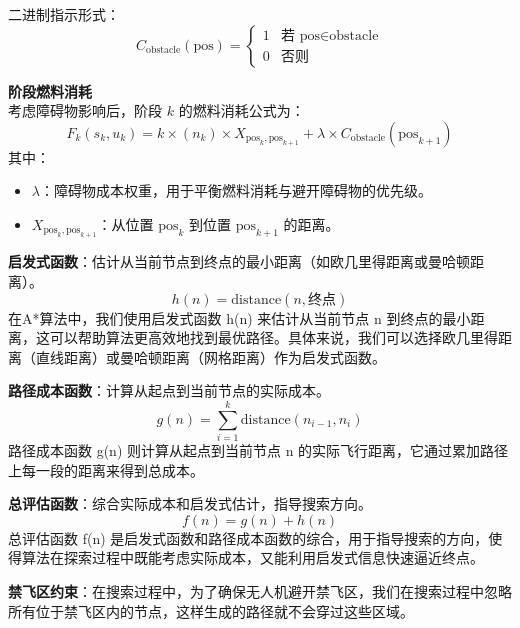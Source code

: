 \documentclass[a4paper]{article} %
\begin{document}
{二进制指示形式：
\begin{equation}
C_{\text{obstacle}}(\text{pos}) = 
\begin{cases} 
1 & \text{若 } \text{pos} \in \text{obstacle} \\
0 & \text{否则}
\end{cases}
\end{equation}

 \textbf{阶段燃料消耗} \\
考虑障碍物影响后，阶段 \( k \) 的燃料消耗公式为：
\begin{equation}
F_{k}(s_{k}, u_{k}) = k \times (n_{k}) \times X_{\text{pos}_{k}, \text{pos}_{k+1}} + \lambda \times C_{\text{obstacle}}(\text{pos}_{k+1})
\end{equation}
其中：
\begin{itemize}
    \item \( \lambda \)：障碍物成本权重，用于平衡燃料消耗与避开障碍物的优先级。
    \item \( X_{\text{pos}_{k}, \text{pos}_{k+1}} \)：从位置 \(\text{pos}_{k}\) 到位置 \(\text{pos}_{k+1}\) 的距离。
\end{itemize}

\textbf{启发式函数}：估计从当前节点到终点的最小距离（如欧几里得距离或曼哈顿距离）。
\begin{equation}
h(n) = \text{distance}(n, \text{终点})
\end{equation}
在A*算法中，我们使用启发式函数 h(n) 来估计从当前节点 n 到终点的最小距离，这可以帮助算法更高效地找到最优路径。具体来说，我们可以选择欧几里得距离（直线距离）或曼哈顿距离（网格距离）作为启发式函数。

\textbf{路径成本函数}：计算从起点到当前节点的实际成本。
\begin{equation}
g(n) = \sum_{i=1}^{k} \text{distance}(n_{i-1}, n_i)
\end{equation}
路径成本函数 g(n) 则计算从起点到当前节点 n 的实际飞行距离，它通过累加路径上每一段的距离来得到总成本。

\textbf{总评估函数}：综合实际成本和启发式估计，指导搜索方向。
\begin{equation}
f(n) = g(n) + h(n)
\end{equation}
总评估函数 f(n) 是启发式函数和路径成本函数的综合，用于指导搜索的方向，使得算法在探索过程中既能考虑实际成本，又能利用启发式信息快速逼近终点。

\textbf{禁飞区约束}：在搜索过程中，为了确保无人机避开禁飞区，我们在搜索过程中忽略所有位于禁飞区内的节点，这样生成的路径就不会穿过这些区域。

}
\end{document}

